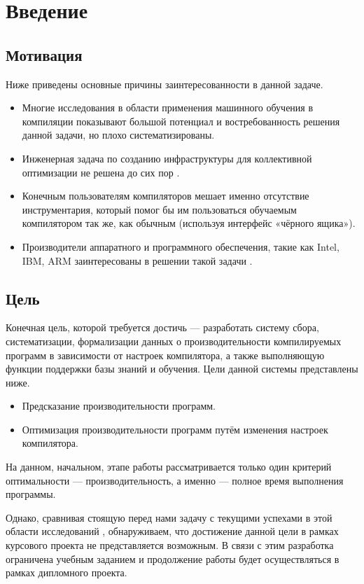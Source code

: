 \section{Введение}
\subsection{Мотивация}
Ниже приведены основные причины заинтересованности в данной задаче.
\begin{itemize}
    \item Многие исследования в области применения машинного обучения в компиляции \cite{Dubach2009PCO,Thomson2009RTT,Stephenson2003MOI} показывают большой потенциал и востребованность решения данной задачи, но плохо систематизированы.
    \item Инженерная задача по созданию инфраструктуры для коллективной оптимизации не решена до сих пор \cite{Fursin2010COP}.
    \item Конечным пользователям компиляторов мешает именно отсутствие инструментария, который помог бы им пользоваться обучаемым компилятором так же, как обычным (используя интерфейс «чёрного ящика»).
    \item Производители аппаратного и программного обеспечения, такие как Intel, IBM, ARM заинтересованы в решении такой задачи \cite{IntelExascale}.
\end{itemize}


\subsection{Цель}
Конечная цель, которой требуется достичь --- разработать систему сбора, систематизации, формализации данных о производительности компилируемых программ в зависимости от настроек компилятора, а также выполняющую функции поддержки базы знаний и обучения. Цели данной системы представлены ниже.
\begin{itemize}
    \item Предсказание производительности программ.
    \item Оптимизация производительности программ путём изменения настроек компилятора.
\end{itemize}

На данном, начальном, этапе работы рассматривается только один критерий оптимальности --- производительность, а именно --- полное время выполнения программы.

Однако, сравнивая стоящую перед нами задачу с текущими успехами в этой области исследований \cite{Fursin2010COP}, обнаруживаем, что достижение данной цели в рамках курсового проекта не представляется возможным. В связи с этим разработка ограничена учебным заданием и продолжение работы будет осуществляться в рамках дипломного проекта.

